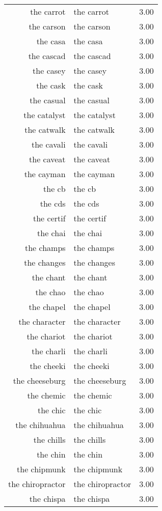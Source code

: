\begin{table}[ht]
\begin{tabular}{rlr}
  the carrot & the carrot & 3.00 \\ 
  the carson & the carson & 3.00 \\ 
  the casa & the casa & 3.00 \\ 
  the cascad & the cascad & 3.00 \\ 
  the casey & the casey & 3.00 \\ 
  the cask & the cask & 3.00 \\ 
  the casual & the casual & 3.00 \\ 
  the catalyst & the catalyst & 3.00 \\ 
  the catwalk & the catwalk & 3.00 \\ 
  the cavali & the cavali & 3.00 \\ 
  the caveat & the caveat & 3.00 \\ 
  the cayman & the cayman & 3.00 \\ 
  the cb & the cb & 3.00 \\ 
  the cds & the cds & 3.00 \\ 
  the certif & the certif & 3.00 \\ 
  the chai & the chai & 3.00 \\ 
  the champs & the champs & 3.00 \\ 
  the changes & the changes & 3.00 \\ 
  the chant & the chant & 3.00 \\ 
  the chao & the chao & 3.00 \\ 
  the chapel & the chapel & 3.00 \\ 
  the character & the character & 3.00 \\ 
  the chariot & the chariot & 3.00 \\ 
  the charli & the charli & 3.00 \\ 
  the cheeki & the cheeki & 3.00 \\ 
  the cheeseburg & the cheeseburg & 3.00 \\ 
  the chemic & the chemic & 3.00 \\ 
  the chic & the chic & 3.00 \\ 
  the chihuahua & the chihuahua & 3.00 \\ 
  the chills & the chills & 3.00 \\ 
  the chin & the chin & 3.00 \\ 
  the chipmunk & the chipmunk & 3.00 \\ 
  the chiropractor & the chiropractor & 3.00 \\ 
  the chispa & the chispa & 3.00 \\ 

\end{tabular}
\end{table}
